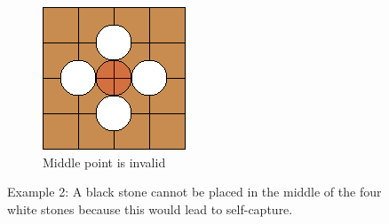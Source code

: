 \documentclass{l4proj}
\begin{document}
\begin{figure}[!ht]
\centering
\begin{subfigure}[b]{0.45\textwidth}
\includegraphics[width=\textwidth]{ex/Ex2-0.png}
\caption{Middle point is invalid}
\label{fig:ex2-0}
\end{subfigure}
\caption{Example 2: A black stone cannot be placed in the middle of the four white stones because this would lead to self-capture.}
\label{fig:ex2}
\end{figure}
\end{document}
